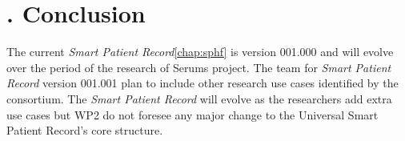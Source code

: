 \addtocounter{chapter}{1}
\setcounter{section}{0}
\setcounter{figure}{0}
\chapter*{\thechapter. Conclusion} 
\label{chap:conclusion}

The current \emph{Smart Patient Record}\ref{chap:sphf} is version 001.000 and will evolve over the period of the research of Serums project. The team for \emph{Smart Patient Record} version 001.001 plan to include other research use cases identified by the consortium. The \emph{Smart Patient Record} will evolve as the researchers add extra use cases but WP2 do not foresee any major change to the Universal Smart Patient Record's core structure.